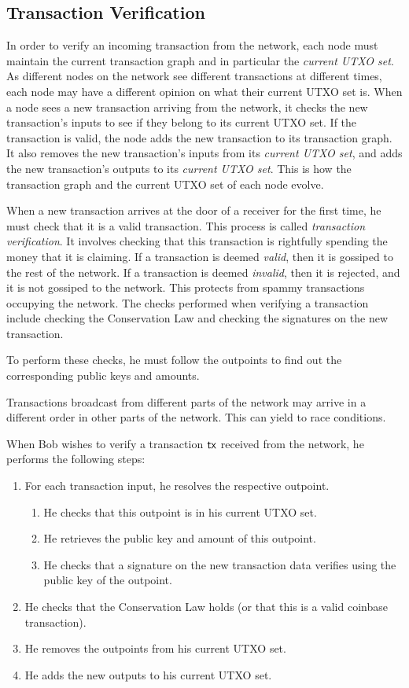 \subsection*{Transaction Verification}

In order to verify an incoming transaction from the network, each node must maintain the current transaction
graph and in particular the \emph{current UTXO set}. As different nodes on the network see different transactions
at different times, each node may have a different opinion on what their current UTXO set is.
When a node sees a new transaction arriving from
the network, it checks the new transaction's inputs to see if they belong to its current UTXO set.
If the transaction is valid, the node adds the new transaction to its transaction graph.
It also removes the new transaction's inputs
from its \emph{current UTXO set}, and adds the new transaction's outputs to its \emph{current UTXO set}.
This is how the transaction graph and the current UTXO set of each node evolve.

When a new transaction arrives at the door of a receiver for the first time, he must check that it is
a valid transaction. This process is called \emph{transaction verification}. It involves checking that
this transaction is rightfully spending the money that it is claiming. If a transaction is deemed \emph{valid},
then it is gossiped to the rest of the network. If a transaction is deemed \emph{invalid}, then it is
rejected, and it is not gossiped to the network. This protects from spammy transactions occupying the
network. The checks performed when verifying a transaction include checking the Conservation Law
and checking the signatures on the new transaction.

To perform these checks, he must follow the outpoints to find out the corresponding
public keys and amounts.

Transactions broadcast from different parts of the network may arrive in a different order in other
parts of the network. This can yield to race conditions.

When Bob wishes to verify a transaction $\mathsf{tx}$ received from the network, he performs the following steps:

\begin{enumerate}
  \item For each transaction input, he resolves the respective outpoint.
  \begin{enumerate}
    \item He checks that this outpoint is in his current UTXO set. \label{enum.tx-double-spend}
    \item He retrieves the public key and amount of this outpoint.
    \item He checks that a signature on the new transaction data verifies using the public key of the outpoint.
  \end{enumerate}
  \item He checks that the Conservation Law holds (or that this is a valid coinbase transaction).
  \item He removes the outpoints from his current UTXO set.
  \item He adds the new outputs to his current UTXO set.
\end{enumerate}

